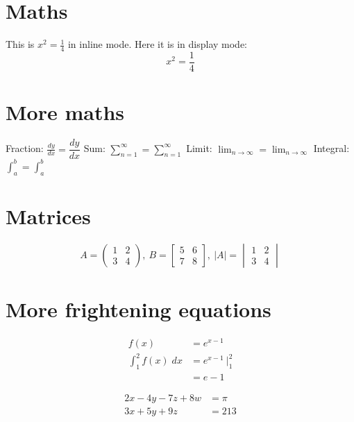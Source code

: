 \documentclass[a4paper,12pt]{article}
\begin{document}
	\section*{Maths}
	This is $x^2 =\frac{1}{4}$ in inline mode.
	Here it is in display mode:
	\begin{displaymath}
		x^2 = \frac{1}{4}
	\end{displaymath}
	
	\section*{More maths}
	Fraction: $\frac{dy}{dx} = \dfrac{dy}{dx}$ \newline
	Sum: $\sum_{n=1}^{\infty} = \displaystyle\sum_{n=1}^{\infty}$ \newline
	Limit: $\lim_{n \to \infty} = \displaystyle\lim_{n \to \infty}$ \newline
	Integral: $\int_a^b = \displaystyle\int_a^b$
	
	\section*{Matrices}
	\begin{displaymath}
		A = \begin{pmatrix} 1 & 2 \\ 3 & 4 \end{pmatrix},~
		B = \begin{bmatrix} 5 & 6 \\ 7 & 8 \end{bmatrix},~
		|A| = \begin{vmatrix} 1 & 2 \\ 3 & 4 \end{vmatrix}
	\end{displaymath}
	
	\section*{More frightening equations}
	\begin{align*}
		f(x) &= e^{x-1}\\
		\int_1^2 f(x)\;dx &= e^{x-1} ~\Bigr|_1^2\\
		&= e - 1
	\end{align*}
	
	\begin{align}
		2x - 4y - 7z + 8w &= \pi\\
		3x + 5y + 9z &= 213
	\end{align}
	
\end{document}
